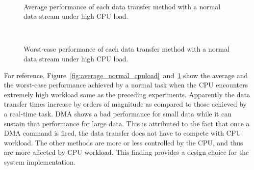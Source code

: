 \begin{figure}[!t]
 \begin{center}
  \\
  \caption{Average performance of each data transfer method with a
  normal data stream under high CPU load.}
  \label{fig:average_normal_cpuload}
 \end{center}
 \vspace{1.5em}
 \begin{center}
  \\
  \caption{Worst-case performance of each data transfer method with a
  normal data stream under high CPU load.}
  \label{fig:worst_normal_cpuload}
 \end{center}
\end{figure}

For reference,
Figure~\ref{fig:average_normal_cpuload}~and~\ref{fig:worst_normal_cpuload}
show the average and the worst-case performance achieved by a normal
task when the CPU encounters extremely high workload same as the
preceding experiments.
Apparently the data transfer times increase by orders of magnitude as
compared to those achieved by a real-time task.
\textsf{DMA} shows a bad performance for small data while it can sustain
that performance for large data.
This is attributed to the fact that once a DMA command is fired, the
data transfer does not have to compete with CPU workload.
The other methods are more or less controlled by the CPU, and thus are
more affected by CPU workload.
This finding provides a design choice for the system implementation.

